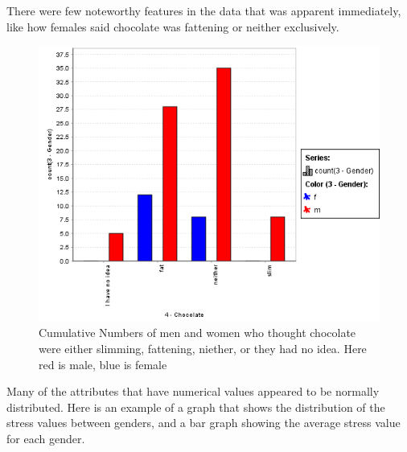 \documentclass{llncs}
\begin{document}
 There were few noteworthy features in the data that was apparent immediately, like how females said chocolate was fattening or neither exclusively.

\begin{figure}[H]
    \centering
    \includegraphics[scale=0.3]{menvswomenvschocolate} 
    \caption{Cumulative Numbers of men and women who thought chocolate were either slimming, fattening, niether, or they had no idea. Here red is male, blue is female }
\end{figure}

Many of the attributes that have numerical values appeared to be normally distributed. Here is an example of a graph that shows the distribution of the stress values between genders, and a bar graph showing the average stress value for each gender.

\begin{figure}[H]
   	\centering
      \hfill
      \caption{}
\end{figure}
\end{document}
